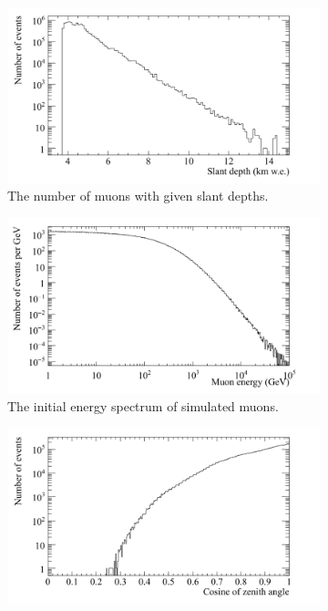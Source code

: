 \begin{figure}
  \centering
  \begin{subfigure}{0.45\textwidth}
    \centering
    \includegraphics[width=\textwidth]{DepthCan}
    \caption{The number of muons with given slant depths.}
  \end{subfigure}
  \hspace{0.08\textwidth}
  \begin{subfigure}{0.45\textwidth}
    \centering
    \includegraphics[width=\textwidth]{EnergyPerGeVCan}
    \caption{The initial energy spectrum of simulated muons.}
  \end{subfigure}
  \begin{subfigure}{0.45\textwidth}
    \centering
    \includegraphics[width=\textwidth]{ZenithCan}

\end{subfigure}
\end{figure}
